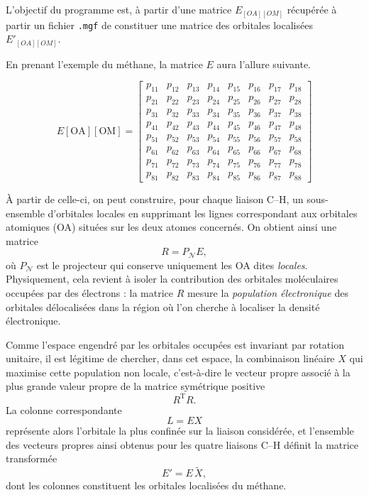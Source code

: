 \documentclass[12pt]{article}
\begin{document}
L'objectif du programme est, à partir d'une matrice $E_{[OA][OM]}$ récupérée à partir un fichier \texttt{.mgf} de constituer une matrice des orbitales localisées $E'_{[OA][OM]}$.

En prenant l'exemple du méthane, la matrice $E$ aura l'allure suivante.

\[
E[\mathrm{OA}][\mathrm{OM}] =
\begin{bmatrix}
p_{11} & p_{12} & p_{13} & p_{14} & p_{15} & p_{16} & p_{17} & p_{18} \\
p_{21} & p_{22} & p_{23} & p_{24} & p_{25} & p_{26} & p_{27} & p_{28} \\
p_{31} & p_{32} & p_{33} & p_{34} & p_{35} & p_{36} & p_{37} & p_{38} \\
p_{41} & p_{42} & p_{43} & p_{44} & p_{45} & p_{46} & p_{47} & p_{48} \\
p_{51} & p_{52} & p_{53} & p_{54} & p_{55} & p_{56} & p_{57} & p_{58} \\
p_{61} & p_{62} & p_{63} & p_{64} & p_{65} & p_{66} & p_{67} & p_{68} \\
p_{71} & p_{72} & p_{73} & p_{74} & p_{75} & p_{76} & p_{77} & p_{78} \\
p_{81} & p_{82} & p_{83} & p_{84} & p_{85} & p_{86} & p_{87} & p_{88}
\end{bmatrix}
\]

À partir de celle-ci, on peut construire, pour chaque liaison C--H, un sous-ensemble d’orbitales locales en supprimant les lignes correspondant aux orbitales atomiques (OA) situées sur les deux atomes concernés.  
On obtient ainsi une matrice 
\[
R = P_{\mathcal{N}} E,
\]
où \(P_{\mathcal{N}}\) est le projecteur qui conserve uniquement les OA dites \emph{locales}.  
Physiquement, cela revient à isoler la contribution des orbitales moléculaires occupées par des électrons : la matrice \(R\) mesure la \emph{population électronique} des orbitales délocalisées dans la région où l’on cherche à localiser la densité électronique.

Comme l’espace engendré par les orbitales occupées est invariant par rotation unitaire, il est légitime de chercher, dans cet espace, la combinaison linéaire \(X\) qui maximise cette population non locale, c’est-à-dire le vecteur propre associé à la plus grande valeur propre de la matrice symétrique positive 
\[
R^{\mathrm T} R.
\]
La colonne correspondante 
\[
L = E X
\]
représente alors l’orbitale la plus confinée sur la liaison considérée, et l’ensemble des vecteurs propres ainsi obtenus pour les quatre liaisons C--H définit la matrice transformée 
\[
E' = E \,\widetilde{X},
\]
dont les colonnes constituent les orbitales localisées du méthane.
\end{document}
